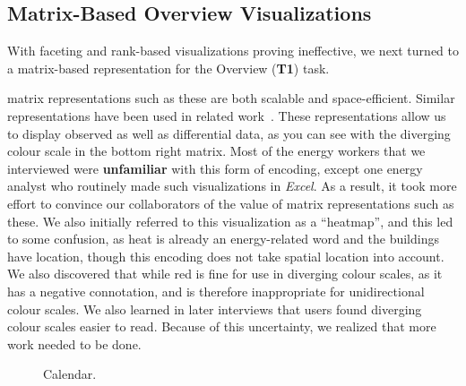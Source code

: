 \documentclass[journal]{vgtc}                %
\newcommand{\bstart}[1]{\vspace{1mm} \noindent{\textbf{#1:}}}
\begin{document}

\subsection{Matrix-Based Overview Visualizations}
\label{design-matrix}



With faceting and rank-based visualizations proving ineffective, we next turned to a matrix-based representation for the Overview ({\bf T1}) task.

\bstart{Time series matrix} matrix representations such as these are both scalable and space-efficient.
Similar representations have been used in related work~\cite{Goodwin2013}.
These representations allow us to display observed as well as differential data, as you can see with the diverging colour scale in the bottom right matrix.
Most of the energy workers that we interviewed were {\bf unfamiliar} with this form of encoding, except one energy analyst who routinely made such visualizations in {\it Excel}. 
As a result, it took more effort to convince our collaborators of the value of matrix representations such as these.
We also initially referred to this visualization as a ``heatmap'', and this led to some confusion, as heat is already an energy-related word and the buildings have location, though this encoding does not take spatial location into account.
We also discovered that while red is fine for use in diverging colour scales, as it has a negative connotation, and is therefore inappropriate for unidirectional colour scales. 
We also learned in later interviews that users found diverging colour scales easier to read.
Because of this uncertainty, we realized that more work needed to be done.

\begin{figure}[ht]
    \vspace{-0.3cm}
	\centering
	\vspace{-0.3cm}
	\caption{Calendar.}
	\label{fig:sandbox-calendar}
	\vspace{-0.3cm}
\end{figure}
\end{document}
